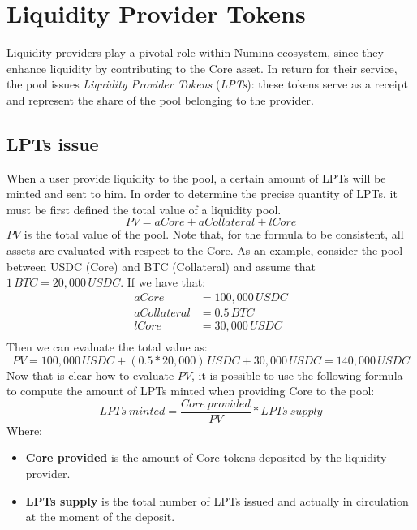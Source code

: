 \documentclass[12pt]{paper}
\begin{document}
\section{Liquidity Provider Tokens}
\label{sec:lptoken}
	Liquidity providers play a pivotal role within Numina ecosystem, since they enhance liquidity by contributing to the Core asset. In return for their service, the pool issues \textit{Liquidity Provider Tokens} (\textit{LPTs}): these tokens serve as a receipt and represent the share of the pool belonging to the provider.
	
	\subsection{LPTs issue}
	\label{subsec:issue}
		When a user provide liquidity to the pool, a certain amount of LPTs will be minted and sent to him. In order to determine the precise quantity of LPTs, it must be first defined the total value of a liquidity pool.
		\begin{equation}
			PV = aCore + aCollateral + lCore
		\end{equation}
		$PV$ is the total value of the pool. Note that, for the formula to be consistent, all assets are evaluated with respect to the Core. As an example, consider the pool between USDC (Core) and BTC (Collateral) and assume that $1 \, BTC = 20,000 \, USDC$. If we have that:
		\begin{equation*}
			\begin{split}
				aCore &= 100,000 \, USDC\\
				aCollateral &= 0.5 \, BTC\\
				lCore &= 30,000 \, USDC\\
			\end{split}
		\end{equation*}
		Then we can evaluate the total value as:
		\begin{equation*}
			PV = 100,000 \, USDC + (0.5*20,000) \, USDC + 30,000 \, USDC = 140,000 \, USDC
		\end{equation*}
		Now that is clear how to evaluate $PV$, it is possible to use the following formula to compute the amount of LPTs minted when providing Core to the pool:
		\begin{equation}
			LPTs\ minted = \frac{Core\ provided}{PV}*LPTs\ supply
		\end{equation}
		Where:
		\begin{itemize}
			\item \textbf{Core provided} is the amount of Core tokens deposited by the liquidity provider.
			\item \textbf{LPTs supply} is the total number of LPTs issued and actually in circulation at the moment of the deposit.
		\end{itemize}
		
\end{document}
